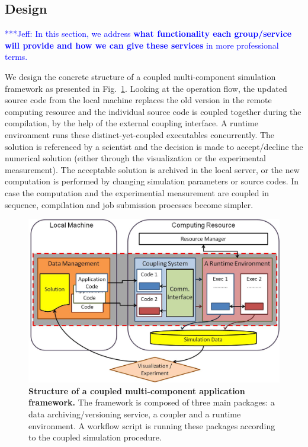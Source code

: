 \documentclass[10pt,conference]{IEEEtran}
\newcommand{\skonote}[1]{ {\textcolor{blue} { ***Jeff: #1 }}}
\newcommand{\skonote}[1]{}
\begin{document}
\subsection{Design}
\skonote{In this section, we address \textbf{what functionality each group/service will provide and how we can give these services} in more professional terms.}

We design the concrete structure of a coupled multi-component simulation framework as presented in Fig.~\ref{Fig:Multicomponent_Framework}. Looking at the operation flow, the updated source code from the local machine replaces the old version in the remote computing resource and the individual source code is coupled together during the compilation, by the help of the external coupling interface. A runtime environment runs these distinct-yet-coupled executables concurrently. The solution is referenced by a scientist and the decision is made to accept/decline the numerical solution (either through the visualization or the experimental measurement). The acceptable solution is archived in the local server, or the new computation is performed by changing simulation parameters or source codes. In case the computation and the experimential measurement are coupled in sequence, compilation and job submission processes become simpler.


\begin{figure}[ht]
\centering
\includegraphics[width=0.8\linewidth]{Coupled_Framework_Diagram.jpg}
\vskip-0.2cm
\caption{\small {\bf Structure of a coupled multi-component application 
framework.} The framework is composed of three main packages: 
a data archiving/versioning service, a coupler and a runtime environment. 
A workflow script is running these packages according to the 
coupled simulation procedure.}
\label{Fig:Multicomponent_Framework}
\end{figure}
\end{document}
